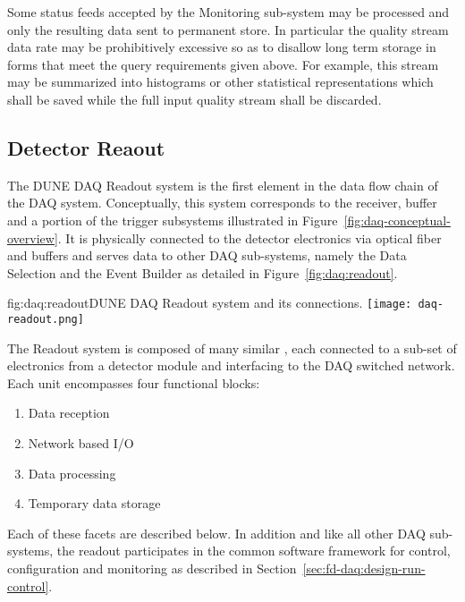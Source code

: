 Some status feeds accepted by the Monitoring sub-system may be processed and only the resulting data sent to permanent store. 
In particular the quality stream data rate may be prohibitively excessive so as to disallow long term storage in forms that meet the query requirements given above. 
For example, this stream may be summarized into histograms or other statistical representations which shall be saved while the full input quality stream shall be discarded.

\subsection{Detector Reaout}
\label{sec:fd-daq:readout}

The DUNE DAQ Readout system is the first element in the data flow chain of the DAQ system.
Conceptually, this system corresponds to the receiver, buffer and a portion of the trigger subsystems illustrated in Figure~\ref{fig:daq-conceptual-overview}.
It is physically connected to the detector electronics via optical fiber and buffers and serves data to other DAQ sub-systems, namely the Data Selection and the Event Builder as detailed in Figure~\ref{fig:daq:readout}.

\begin{dunefigure}{fig:daq:readout}{DUNE DAQ Readout system and its connections.}
  \texttt{[image: daq-readout.png]}
\end{dunefigure}

The Readout system is composed of many similar , each connected to a sub-set of electronics from a detector module and interfacing to the DAQ switched network.  Each unit encompasses four functional blocks:

\begin{enumerate}
\item Data reception
\item Network based I/O
\item Data processing
\item Temporary data storage
\end{enumerate}

Each of these facets are described below.  In addition and like all other DAQ sub-systems, the readout participates in the common software framework for control, configuration and monitoring as described in Section~\ref{sec:fd-daq:design-run-control}.


